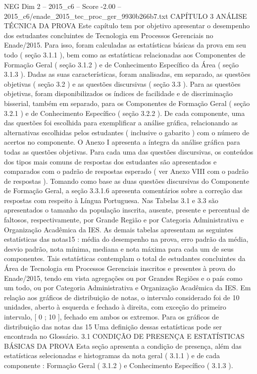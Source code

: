 \begin{textsample}{NEG Dim 2 – 2015\_c6 – Score -2.00 – 2015\_c6/enade\_2015\_tec\_proc\_ger\_9930b266b7.txt}  \label{ex:f2_neg_192}
CAPÍTULO 3 ANÁLISE TÉCNICA DA PROVA Este capítulo tem por objetivo apresentar o desempenho dos estudantes concluintes de Tecnologia em Processos Gerenciais no Enade/2015.
Para isso, foram calculadas as estatísticas básicas da prova em seu todo ( seção 3.1.1 ), bem como as estatísticas relacionadas aos Componentes de Formação Geral ( seção 3.1.2 ) e de Conhecimento Específico da Área ( seção 3.1.3 ).
Dadas as suas características, foram analisadas, em separado, as questões objetivas ( seção 3.2 ) e as questões discursivas ( seção 3.3 ).
Para as questões objetivas, foram disponibilizados os índices de facilidade e de discriminação bisserial, também em separado, para os Componentes de Formação Geral ( seção 3.2.1 ) e de Conhecimento Específico ( seção 3.2.2 ).
De cada componente, uma das questões foi escolhida para exemplificar a análise gráfica, relacionando as alternativas escolhidas pelos estudantes ( inclusive o gabarito ) com o número de acertos no componente.
O Anexo I apresenta a íntegra da análise gráfica para todas as questões objetivas.
Para cada uma das questões discursivas, os conteúdos dos tipos mais comuns de respostas dos estudantes são apresentados e comparados com o padrão de respostas esperado ( ver Anexo VIII com o padrão de respostas ).
Tomando como base as duas questões discursivas do Componente de Formação Geral, a seção 3.3.1.6 apresenta comentários sobre a correção das respostas com respeito à Língua Portuguesa.
Nas Tabelas 3.1 e 3.3 são apresentados o tamanho da população inscrita, ausente, presente e percentual de faltosos, respectivamente, por Grande Região e por Categoria Administrativa e Organização Acadêmica da IES.
As demais tabelas apresentam as seguintes estatísticas das notas15 : média do desempenho na prova, erro padrão da média, desvio padrão, nota mínima, mediana e nota máxima para cada um de seus componentes.
Tais estatísticas contemplam o total de estudantes concluintes da Área de Tecnologia em Processos Gerenciais inscritos e presentes à prova do Enade/2015, tendo em vista agregações ou por Grandes Regiões e o país como um todo, ou por Categoria Administrativa e Organização Acadêmica da IES.
Em relação aos gráficos de distribuição de notas, o intervalo considerado foi de 10 unidades, aberto à esquerda e fechado à direita, com exceção do primeiro intervalo, [ 0 ; 10 ], fechado em ambos os extremos.
Para os gráficos de distribuição das notas das 15 Uma definição dessas estatísticas pode ser encontrada no Glossário. 3.1 CONDIÇÃO DE PRESENÇA E ESTATÍSTICAS BÁSICAS DA PROVA Esta seção apresenta a condição de presença, além das estatísticas selecionadas e histogramas da nota geral ( 3.1.1 ) e de cada componente : Formação Geral ( 3.1.2 ) e Conhecimento Específico ( 3.1.3 ).

\end{textsample}
